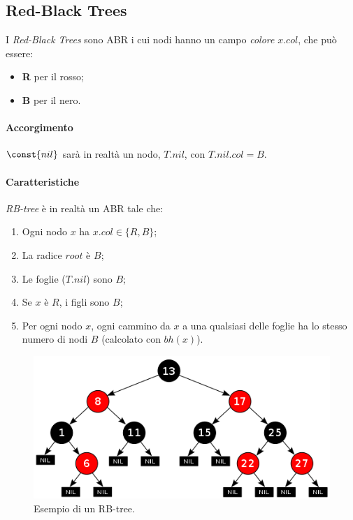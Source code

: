 \subsection{Red-Black Trees}

I \emph{Red-Black Trees} sono ABR i cui nodi hanno un campo \emph{colore} $x.col$, che può essere:
\begin{itemize}[noitemsep]
    \item \textbf{R} per il rosso;
    \item \textbf{B} per il nero.
\end{itemize}

\paragraph{Accorgimento} $\const{nil}$ sarà in realtà un nodo,
$T.nil$, con $T.nil.col = B$.

\paragraph{Caratteristiche} \emph{RB-tree} è in realtà un ABR tale che:
\begin{enumerate}[label=($\arabic*$)]
    \item Ogni nodo $x$ ha $x.col \in \{R,B\}$; \label{rbtree:1}
    \item La radice $root$ è $B$; \label{rbtree:2}
    \item Le foglie ($T.nil$) sono $B$; \label{rbtree:3}
    \item Se $x$ è $R$, i figli sono $B$; \label{rbtree:4}
    \item Per ogni nodo $x$, ogni cammino da $x$ a una qualsiasi delle foglie
    ha lo stesso numero di nodi $B$ (calcolato con $bh(x)$). \label{rbtree:5}
\end{enumerate} 

\begin{figure}[hbt]
    \centering
    \includegraphics[width=\textwidth]{img/rb-tree-ex.png}
    \caption{Esempio di un RB-tree.}
\end{figure}
\pagebreak

